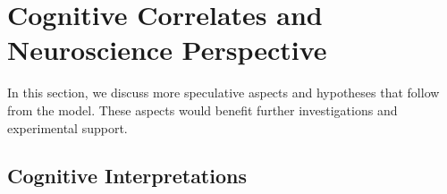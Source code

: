 \documentclass{frontiersSCNS} %
\begin{document}



%
%
%
%
%
%
%
%
%

\section{Cognitive Correlates and Neuroscience Perspective}
\label{sec:cognition-neuroscience}

In this section, we discuss more speculative aspects and hypotheses that follow
from the model. These aspects would benefit further investigations and
experimental support.

\subsection{Cognitive Interpretations}
\label{sec:cognitive-model}
\end{document}
